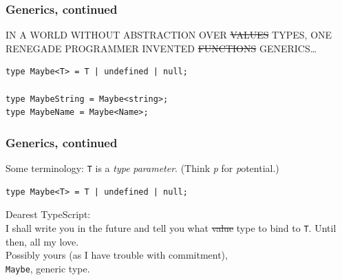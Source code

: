 \documentclass[aspectratio=169]{beamer}
\begin{document}
\begin{frame}[fragile]
  \frametitle{Generics, continued}

  IN A WORLD WITHOUT ABSTRACTION OVER \sout{VALUES} TYPES, ONE RENEGADE
  PROGRAMMER INVENTED \sout{FUNCTIONS} GENERICS\ldots \\

  \begin{verbatim}
type Maybe<T> = T | undefined | null;

type MaybeString = Maybe<string>;
type MaybeName = Maybe<Name>;
  \end{verbatim}
\end{frame}

\begin{frame}[fragile]
  \frametitle{Generics, continued}

  Some terminology: \texttt{T} is a \emph{type} \textit{parameter}. (Think
  \textit{p} for \textit{p}otential.) \\

  \begin{verbatim}
type Maybe<T> = T | undefined | null;
  \end{verbatim}

  \vspace{1em}

  \begin{tcolorbox}
    Dearest TypeScript: \\

    I shall write you in the future and tell you what \sout{value} type to
    bind to \texttt{T}. Until then, all my love. \\

    Possibly yours (as I have trouble with commitment), \\
    \texttt{Maybe}, generic type.
  \end{tcolorbox}
\end{frame}
\end{document}
